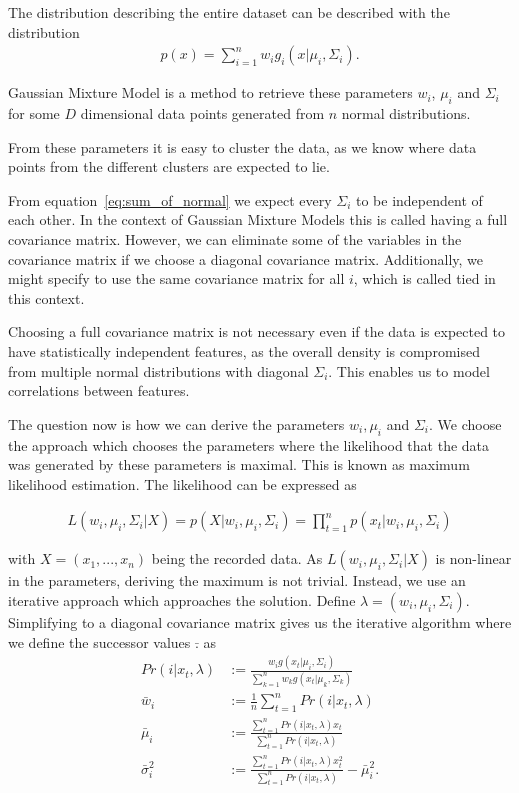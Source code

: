 The distribution describing the entire dataset can be described with the distribution
\begin{align}
	\label{eq:sum_of_normal}
	p(x) = \sum_{i=1}^{n} w_i g_i(x|\mu_i, \Sigma_i).
\end{align}

Gaussian Mixture Model is a method to retrieve these parameters $w_i$, $\mu_i$ and $\Sigma_i$ for some $D$ dimensional data points generated from $n$ normal distributions.

From these parameters it is easy to cluster the data, as we know where data points from the different clusters are expected to lie.

From equation~\ref{eq:sum_of_normal} we expect every $\Sigma_i$ to be independent of each other. In the context of Gaussian Mixture Models this is called having a full covariance matrix. However, we can eliminate some of the variables in the covariance matrix if we choose a diagonal covariance matrix. Additionally, we might specify to use the same covariance matrix for all $i$, which is called tied in this context.

Choosing a full covariance matrix is not necessary even if the data is expected to have statistically independent features, as the overall density is compromised from multiple normal distributions with diagonal $\Sigma_i$. This enables us to model correlations between features.

The question now is how we can derive the parameters $w_i, \mu_i$ and $\Sigma_i$. We choose the approach which chooses the parameters where the likelihood that the data was generated by these parameters is maximal. This is known as maximum likelihood estimation. The likelihood can be expressed as

\begin{align*}
	L(w_i, \mu_i, \Sigma_i|X) = p(X|w_i, \mu_i, \Sigma_i) = \prod_{t=1}^n p(x_t|w_i, \mu_i, \Sigma_i)
\end{align*}

with $X = (x_1, ..., x_n)$ being the recorded data. As $L(w_i, \mu_i, \Sigma_i|X)$ is non-linear in the parameters, deriving the maximum is not trivial. Instead, we use an iterative approach which approaches the solution. Define $\lambda = (w_i, \mu_i, \Sigma_i)$. Simplifying to a diagonal covariance matrix gives us the iterative algorithm where we define the successor values $\bar{.}$ as
\begin{align*}
	Pr(i | x_t, \lambda) &:= \frac{w_i g(x_t | \mu_i, \Sigma_i)}{\sum_{k=1}^{n} w_k g(x_t | \mu_k, \Sigma_k)}\\
	\bar{w}_i &:= \frac{1}{n} \sum_{t=1}^{n} Pr(i | x_t, \lambda)\\
	\bar{\mu}_i &:= \frac{\sum_{t=1}^{n} Pr(i | x_t, \lambda) x_t}{\sum_{t=1}^{n} Pr(i | x_t, \lambda)}\\
	\bar{\sigma}_i^2 &:= \frac{\sum_{t=1}^{n} Pr(i | x_t, \lambda) x_t^2}{\sum_{t=1}^{n} Pr(i | x_t, \lambda)} - \bar{\mu}_i^2.
\end{align*}

